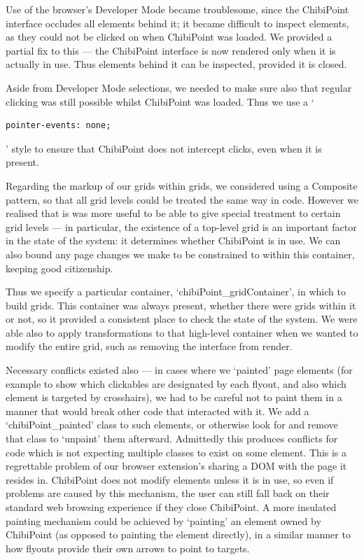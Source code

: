 \documentclass[11pt,openright,a4paper]{report}
\begin{document}
Use of the browser's Developer Mode became troublesome, since the ChibiPoint interface occludes all elements behind it; it became difficult to inspect elements, as they could not be clicked on when ChibiPoint was loaded. We provided a partial fix to this --- the ChibiPoint interface is now rendered only when it is actually in use. Thus elements behind it can be inspected, provided it is closed.

Aside from Developer Mode selections, we needed to make sure also that regular clicking was still possible whilst ChibiPoint was loaded. Thus we use a `\begin{verbatim}pointer-events: none;\end{verbatim}' style to ensure that ChibiPoint does not intercept clicks, even when it is present.

Regarding the markup of our grids within grids, we considered using a Composite pattern\cite{gamma1994design}, so that all grid levels could be treated the same way in code. However we realised that is was more useful to be able to give special treatment to certain grid levels --- in particular, the existence of a top-level grid is an important factor in the state of the system: it determines whether ChibiPoint is in use. We can also bound any page changes we make to be constrained to within this container, keeping good citizenship.

Thus we specify a particular container, `chibiPoint\_gridContainer', in which to build grids. This container was always present, whether there were grids within it or not, so it provided a consistent place to check the state of the system. We were able also to apply transformations to that high-level container when we wanted to modify the entire grid, such as removing the interface from render.

Necessary conflicts existed also --- in cases where we `painted' page elements (for example to show which clickables are designated by each flyout, and also which element is targeted by crosshairs), we had to be careful not to paint them in a manner that would break other code that interacted with it. We add a `chibiPoint\_painted' class to such elements, or otherwise look for and remove that class to `unpaint' them afterward. Admittedly this produces conflicts for code which is not expecting multiple classes to exist on some element. This is a regrettable problem of our browser extension's sharing a DOM with the page it resides in. ChibiPoint does not modify elements unless it is in use, so even if problems are caused by this mechanism, the user can still fall back on their standard web browsing experience if they close ChibiPoint. A more insulated painting mechanism could be achieved by `painting' an element owned by ChibiPoint (as opposed to painting the element directly), in a similar manner to how flyouts provide their own arrows to point to targets.
\end{document}
